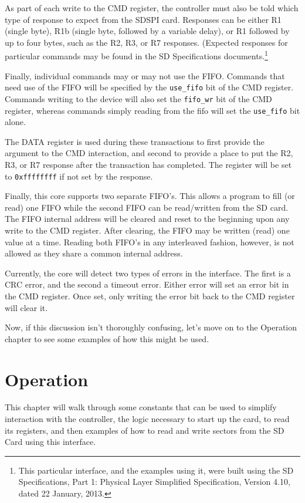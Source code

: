 \documentclass{gqtekspec}
\begin{document}
As part of each write to the CMD register, the controller must also be told
which type of response to expect from the SDSPI card.  Responses can be either
R1 (single byte), R1b (single byte, followed by a variable delay), or R1
followed by up to four bytes, such as the R2, R3, or R7 responses.
(Expected responses for particular commands may be found in the SD
Specifications documents.\footnote{This particular interface, and the examples
using it, were built using the SD Specifications, Part 1: Physical Layer
Simplified Specification, Version 4.10, dated 22 January, 2013.}

Finally, individual commands may or may not use the FIFO.  Commands that need
use of the FIFO will be specified by the {\tt use\_fifo} bit of the CMD
register.  Commands writing to the device will also set the {\tt fifo\_wr} bit
of the CMD register, whereas commands simply reading from the fifo will set the
{\tt use\_fifo} bit alone.

The DATA register is used during these transactions to first provide the 
argument to the CMD interaction, and second to provide a place to put the
R2, R3, or R7 response after the transaction has completed.  The register will
be set to {\tt 0xffffffff} if not set by the response.

Finally, this core supports two separate FIFO's.  This allows a program to
fill (or read) one FIFO while the second FIFO can be read/written from the
SD card.  The FIFO internal address will be cleared and reset to the beginning
upon any write to the CMD register.  After clearing, the FIFO may be written
(read) one value at a time.  Reading both FIFO's in any interleaved fashion,
however, is not allowed as they share a common internal address.

Currently, the core will detect two types of errors in the interface.  The
first is a CRC error, and the second a timeout error.  Either error will set
an error bit in the CMD register.  Once set, only writing the error bit back
to the CMD register will clear it.

Now, if this discussion isn't thoroughly confusing, let's move on to the 
Operation chapter to see some examples of how this might be used.

\chapter{Operation}\label{ch:ops}
This chapter will walk through some constants that can be used to simplify
interaction with the controller, the logic necessary to start up the card,
to read its registers, and then examples of how to read and write sectors
from the SD Card using this interface.
\end{document}
